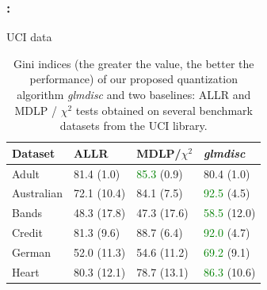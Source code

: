 \documentclass[english,xcolor={rgb,dvipsnames,table,usenames}]{beamer}
\begin{document}
\begin{frame}

\frametitle{\secname: \subsecname}

UCI data

\medskip

\begin{table}
    \centering
        \caption{Gini indices (the greater the value, the better the performance) of our proposed quantization algorithm \textit{glmdisc} and two baselines: ALLR and MDLP / $\chi^2$ tests obtained on several benchmark datasets from the UCI library.}
    \label{tab:banchmark}
\begin{tabular}{llll}
Dataset & ALLR & MDLP/$\chi^2$ & \textit{glmdisc} \\
\hline
Adult & 81.4 (1.0) & \textcolor{green}{85.3} (0.9) & 80.4 (1.0) \\
Australian & 72.1 (10.4) & 84.1 (7.5) & \textcolor{green}{92.5} (4.5) \\
Bands & 48.3 (17.8) & 47.3 (17.6) & \textcolor{green}{58.5} (12.0) \\
Credit & 81.3 (9.6) & 88.7 (6.4) & \textcolor{green}{92.0} (4.7) \\
German & 52.0 (11.3) & 54.6 (11.2) & \textcolor{green}{69.2} (9.1) \\
Heart & 80.3 (12.1) & 78.7 (13.1) & \textcolor{green}{86.3} (10.6)
\end{tabular}
\end{table}


\end{frame}
\end{document}
